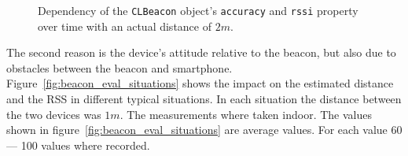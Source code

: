 \begin{figure}
\caption {Dependency of the \texttt{CLBeacon} object's \texttt{accuracy} and \texttt{rssi} property over time with an actual distance of $2m$.}
\label{fig:beacon_eval_accuracy-rssi}
\end{figure}

The second reason is the device's attitude relative to the beacon, but also due to obstacles between the beacon and smartphone.
Figure~\ref{fig:beacon_eval_situations} shows the impact on the estimated distance and the \acs{RSS} in different typical situations.
In each situation the distance between the two devices was $1m$. The measurements where taken indoor. The values shown in figure~\ref{fig:beacon_eval_situations} are average values. For each value 60 --- 100 values where recorded.

